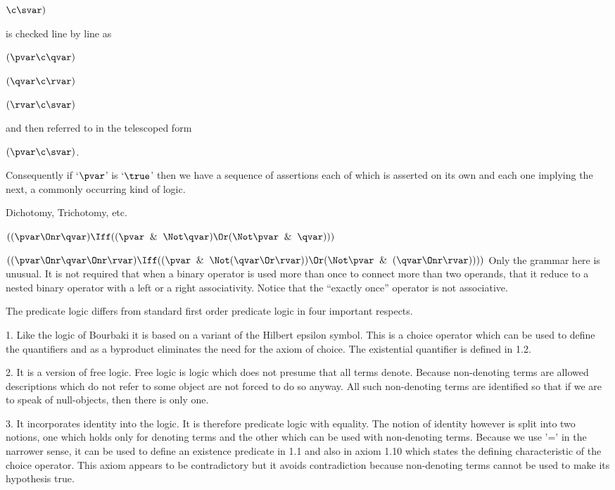 \lineb $\c \svar)$

is checked line by line as

$(\pvar \c \qvar)$

$(\qvar \c \rvar)$

$(\rvar \c \svar)$

and then referred to in the telescoped form

$(\pvar \c \svar)$.

Consequently if `$\pvar$' is `$\true$' then we have
a sequence of assertions each of which is asserted
on its own and each one implying the next, a commonly
occurring kind of logic.  
\lineb


\noindent{}Dichotomy, Trichotomy, etc.

$((\pvar \Onr \qvar )\Iff ((\pvar \And \Not\qvar)
\Or (\Not\pvar \And \qvar)))$

$((\pvar \Onr \qvar \Onr \rvar) \Iff ((\pvar \And \Not(\qvar \Or \rvar))
\Or (\Not\pvar \And(\qvar \Onr \rvar))))$
\lineb
Only the grammar here is unusual.  It is not required that when a binary
operator is used more than once to connect more than two operands, that it reduce
to a nested binary operator with a left or a right associativity.
Notice that the ``exactly once'' operator is not associative.
\lineb


The predicate logic differs from standard first order predicate logic in
four important respects.   

1.  Like the logic of Bourbaki it is based on a variant of
the Hilbert epsilon symbol.  This is a choice operator which
can be used to define the quantifiers and as a byproduct 
eliminates the need for the axiom of choice.
The existential
quantifier is defined in 1.2. 

2.  It is a version of free logic.  Free logic is logic which 
does not presume that all terms denote.  Because non-denoting
terms are allowed descriptions which do not refer to some object 
are not forced to do so anyway.  All such non-denoting terms
are identified so that if we are to speak of null-objects,
then there is only one.


3.  It incorporates identity into the logic.  It is therefore
predicate logic with equality.  The notion of identity however is
split into two notions, one which holds only for denoting terms
and the other which can be used with non-denoting terms. 
Because we use '=' in the narrower sense, it can be used to define
an existence predicate in 1.1 and also in axiom 1.10 which states the
defining characteristic of the choice operator.  This axiom appears
to be contradictory but it avoids contradiction because
non-denoting terms cannot be used to make its hypothesis true. 

